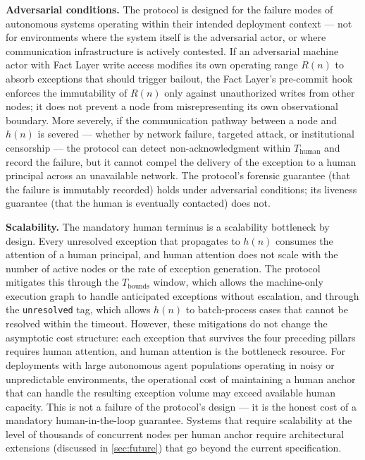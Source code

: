 \medskip\noindent\textbf{Adversarial conditions.}%
\label{sec:lim:adversarial}
The protocol is designed for the failure modes of autonomous systems operating within their intended deployment context — not for environments where the system itself is the adversarial actor, or where communication infrastructure is actively contested. If an adversarial machine actor with Fact Layer write access modifies its own operating range $R(n)$ to absorb exceptions that should trigger bailout, the Fact Layer's pre-commit hook enforces the immutability of $R(n)$ only against unauthorized writes from other nodes; it does not prevent a node from misrepresenting its own observational boundary. More severely, if the communication pathway between a node and $h(n)$ is severed — whether by network failure, targeted attack, or institutional censorship — the protocol can detect non-acknowledgment within $T_{\mathrm{human}}$ and record the failure, but it cannot compel the delivery of the exception to a human principal across an unavailable network. The protocol's forensic guarantee (that the failure is immutably recorded) holds under adversarial conditions; its liveness guarantee (that the human is eventually contacted) does not.

\medskip\noindent\textbf{Scalability.}%
\label{sec:lim:scalability}
The mandatory human terminus is a scalability bottleneck by design. Every unresolved exception that propagates to $h(n)$ consumes the attention of a human principal, and human attention does not scale with the number of active nodes or the rate of exception generation. The protocol mitigates this through the $T_{\mathrm{bounds}}$ window, which allows the machine-only execution graph to handle anticipated exceptions without escalation, and through the \texttt{unresolved} tag, which allows $h(n)$ to batch-process cases that cannot be resolved within the timeout. However, these mitigations do not change the asymptotic cost structure: each exception that survives the four preceding pillars requires human attention, and human attention is the bottleneck resource. For deployments with large autonomous agent populations operating in noisy or unpredictable environments, the operational cost of maintaining a human anchor that can handle the resulting exception volume may exceed available human capacity. This is not a failure of the protocol's design — it is the honest cost of a mandatory human-in-the-loop guarantee. Systems that require scalability at the level of thousands of concurrent nodes per human anchor require architectural extensions (discussed in \autoref{sec:future}) that go beyond the current specification.

